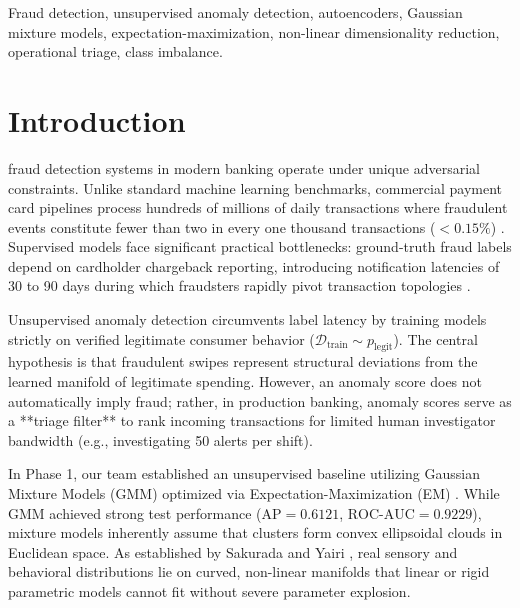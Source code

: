 \documentclass[10pt,journal,compsoc]{IEEEtran}
\begin{document}
{\begin{IEEEkeywords}
Fraud detection, unsupervised anomaly detection, autoencoders, Gaussian mixture models, expectation-maximization, non-linear dimensionality reduction, operational triage, class imbalance.
\end{IEEEkeywords}}

\maketitle
\IEEEdisplaynontitleabstractindextext

\section{Introduction}
 fraud detection systems in modern banking operate under unique adversarial constraints. Unlike standard machine learning benchmarks, commercial payment card pipelines process hundreds of millions of daily transactions where fraudulent events constitute fewer than two in every one thousand transactions ($<0.15\%$) \cite{dalpozzolo2018credit}. Supervised models face significant practical bottlenecks: ground-truth fraud labels depend on cardholder chargeback reporting, introducing notification latencies of 30 to 90 days during which fraudsters rapidly pivot transaction topologies \cite{carcillo2018scarff}. 

Unsupervised anomaly detection circumvents label latency by training models strictly on verified legitimate consumer behavior ($\mathcal{D}_{\text{train}} \sim p_{\text{legit}}$). The central hypothesis is that fraudulent swipes represent structural deviations from the learned manifold of legitimate spending. However, an anomaly score does not automatically imply fraud; rather, in production banking, anomaly scores serve as a **triage filter** to rank incoming transactions for limited human investigator bandwidth (e.g., investigating 50 alerts per shift).

In Phase 1, our team established an unsupervised baseline utilizing Gaussian Mixture Models (GMM) optimized via Expectation-Maximization (EM) \cite{dempster1977maximum}. While GMM achieved strong test performance ($\text{AP} = 0.6121$, $\text{ROC-AUC} = 0.9229$), mixture models inherently assume that clusters form convex ellipsoidal clouds in Euclidean space. As established by Sakurada and Yairi \cite{sakurada2014anomaly}, real sensory and behavioral distributions lie on curved, non-linear manifolds that linear or rigid parametric models cannot fit without severe parameter explosion.
\end{document}
